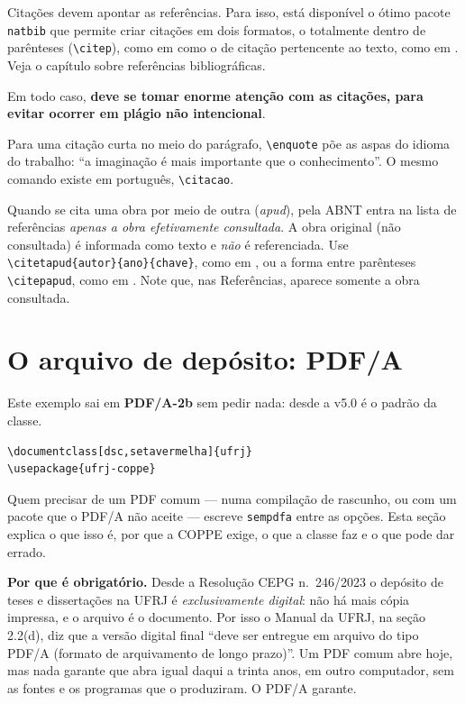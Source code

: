 \documentclass[dsc,setavermelha]{ufrj}
\theoremstyle{plain}
\theoremstyle{definition}
\theoremstyle{remark}
\begin{document}
  Citações devem apontar as referências. Para isso, está disponível o ótimo pacote \verb*|natbib| que permite criar citações em dois formatos, o totalmente dentro de parênteses (\verb*|\citep|), como em \citep{article-example} como o de citação pertencente ao texto, como em \citet{article-example}. Veja o capítulo sobre referências bibliográficas.

  Em todo caso, \textbf{deve se tomar enorme atenção com as citações, para evitar ocorrer em plágio não intencional}.

  Para uma citação curta no meio do parágrafo, \verb|\enquote| põe as aspas do idioma do trabalho: \enquote{a imaginação é mais importante que o conhecimento}. O mesmo comando existe em português, \verb|\citacao|.

  Quando se cita uma obra por meio de outra (\textit{apud}), pela ABNT entra na lista de referências \emph{apenas a obra efetivamente consultada}. A obra original (não consultada) é informada como texto e \emph{não} é referenciada. Use \verb*|\citetapud{autor}{ano}{chave}|, como em , ou a forma entre parênteses \verb*|\citepapud|, como em . Note que, nas Referências, aparece somente a obra consultada.

\section{O arquivo de depósito: PDF/A}
\label{sec:pdfa}

Este exemplo sai em \textbf{PDF/A-2b} sem pedir nada: desde a v5.0 é o padrão da classe.
\begin{verbatim}
\documentclass[dsc,setavermelha]{ufrj}
\usepackage{ufrj-coppe}
\end{verbatim}
Quem precisar de um PDF comum --- numa compilação de rascunho, ou com um pacote que o PDF/A não aceite --- escreve \verb|sempdfa| entre as opções. Esta seção explica o que isso é, por que a COPPE exige, o que a classe faz e o que pode dar errado.

\textbf{Por que é obrigatório.} Desde a Resolução CEPG n.~246/2023 o depósito de teses e dissertações na UFRJ é \emph{exclusivamente digital}: não há mais cópia impressa, e o arquivo é o documento. Por isso o Manual da UFRJ, na seção 2.2(d), diz que a versão digital final ``deve ser entregue em arquivo do tipo PDF/A (formato de arquivamento de longo prazo)''. Um PDF comum abre hoje, mas nada garante que abra igual daqui a trinta anos, em outro computador, sem as fontes e os programas que o produziram. O PDF/A garante.
\end{document}

